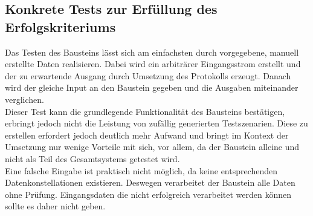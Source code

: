 \documentclass{article}
\begin{document}
  \subsection{Konkrete Tests zur Erfüllung des Erfolgskriteriums}
	Das Testen des Bausteins lässt sich am einfachsten durch vorgegebene, manuell erstellte Daten realisieren. Dabei wird ein arbiträrer Eingangsstrom erstellt und der zu erwartende Ausgang durch Umsetzung des Protokolls erzeugt. Danach wird der gleiche Input an den Baustein gegeben und die Ausgaben miteinander verglichen.\\
	Dieser Test kann die grundlegende Funktionalität des Bausteins bestätigen, erbringt jedoch nicht die Leistung von zufällig generierten Testszenarien. Diese zu erstellen erfordert jedoch deutlich mehr Aufwand und bringt im Kontext der Umsetzung nur wenige Vorteile mit sich, vor allem, da der Baustein alleine und nicht als Teil des Gesamtsystems getestet wird.\\
	Eine falsche Eingabe ist praktisch nicht möglich, da keine entsprechenden Datenkonstellationen existieren. Deswegen verarbeitet der Baustein alle Daten ohne Prüfung. Eingangsdaten die nicht erfolgreich verarbeitet werden können sollte es daher nicht geben.
\end{document}
